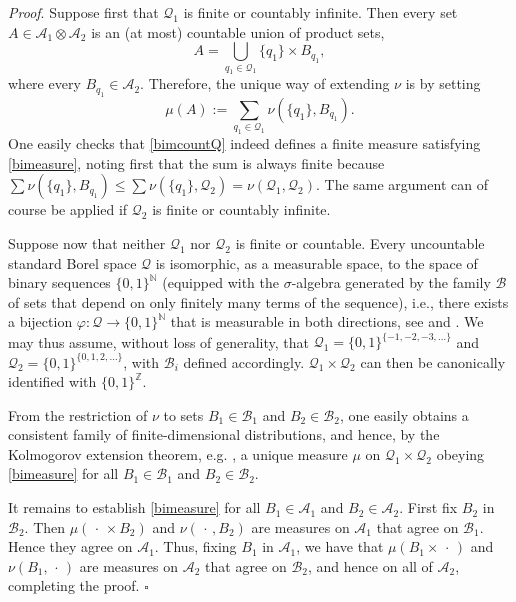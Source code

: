 \documentclass[12pt]{article}
\newcommand{\NNN}{\mathbb{N}} %
\newcommand{\ZZZ}{\mathbb{Z}} %
\newcommand{\1}{\mathbf{1}} %
\newcommand{\conf}{\mathcal{Q}} %
\newcommand{\salg}{\mathcal{A}} %
\newenvironment{proof}{\noindent 
\textit{Proof}.}{\hfill$\square$\bigskip}
\begin{document}
\begin{proof}
Suppose first that $\conf_1$ is finite or countably infinite. Then
every set $A \in \salg_1 \otimes \salg_2$ is an (at most) countable
union of product sets,
\[
   A = \bigcup_{q_1 \in \conf_1} \{ q_1 \} \times B_{q_1},
\]
where every $B_{q_1} \in \salg_2$. Therefore, the unique way of
extending $\nu$ is by setting
\begin{equation}\label{bimcountQ}
   \mu(A) := \sum_{q_1 \in \conf_1} \nu(\{q_1\}, B_{q_1}).
\end{equation}
One easily checks that \eqref{bimcountQ} indeed defines a finite measure
satisfying \eqref{bimeasure},
noting first that the sum is always finite because $\sum \nu(\{ q_1\},
B_{q_1}) \leq \sum \nu(\{ q_1\}, \conf_2) = \nu(\conf_1,\conf_2)$.
The same argument can of course be applied if $\conf_2$ is finite or 
countably
infinite.

Suppose now that neither $\conf_1$ nor $\conf_2$ is finite or countable.
Every uncountable standard Borel space $\conf$ is isomorphic, as a
measurable space, to the space of binary sequences $\{0,1\}^\NNN$
(equipped with the $\sigma$-algebra generated by the family
$\mathcal{B}$ of sets that depend on only finitely many terms of the
sequence), i.e., there exists a bijection $\varphi: \conf \to
\{0,1\}^\NNN$ that is measurable in both directions, see
\cite[p.~138]{Mackey} and \cite[p.~358]{Kuratowski}. We may thus assume,
without loss of generality, that $\conf_1=\{0,1\}^{\{-1,-2,-3,\dots\}}$ 
and
$\conf_2=\{0,1\}^{\{0,1,2,\dots\}}$, with $\mathcal{B}_i$ defined
accordingly. $\conf_1 \times \conf_2$ can then be canonically identified
with $\{0,1\}^\ZZZ$.

{}From the restriction of $\nu$ to sets
$B_1\in\mathcal{B}_1$ and $B_2\in\mathcal{B}_2$, one easily obtains a
consistent family of finite-dimensional distributions, and hence, by the
Kolmogorov extension theorem, e.g. \cite[p.~24]{Breiman}, a unique 
measure
$\mu$ on  $\conf_1 \times \conf_2$ obeying \eqref{bimeasure} for all 
$B_1\in\mathcal{B}_1$ and $B_2\in\mathcal{B}_2$.

It remains to establish \eqref{bimeasure} for all $B_1\in\salg_1$ and
$B_2\in\salg_2$. First fix $B_2$ in $\mathcal{B}_2$. Then $\mu(\,\cdot\,
\times B_2)$ and $\nu(\,\cdot\,, B_2)$ are measures on $\salg_1$ that 
agree
on $\mathcal{B}_1$. Hence they agree on $\salg_1$. Thus, fixing $B_1$ in
$\salg_1$, we have that $\mu(B_1\times \,\cdot\,)$ and $\nu(B_1,
\,\cdot\,)$ are measures on $\salg_2$ that agree on $\mathcal{B}_2$, and
hence on all of $\salg_2$, completing the proof.
\end{proof}
\end{document}
